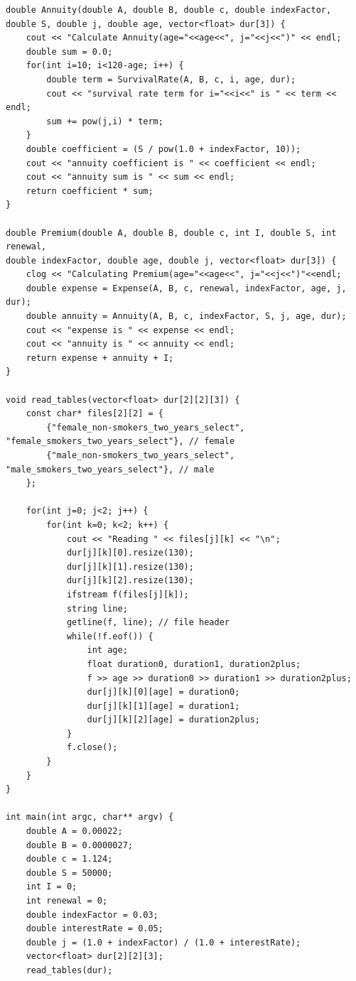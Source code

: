 \documentclass{report}
\begin{document}
\begin{verbatim}
double Annuity(double A, double B, double c, double indexFactor, 
double S, double j, double age, vector<float> dur[3]) {
    cout << "Calculate Annuity(age="<<age<<", j="<<j<<")" << endl;
    double sum = 0.0;
    for(int i=10; i<120-age; i++) {
        double term = SurvivalRate(A, B, c, i, age, dur);
        cout << "survival rate term for i="<<i<<" is " << term << endl;
        sum += pow(j,i) * term;
    }
    double coefficient = (S / pow(1.0 + indexFactor, 10));
    cout << "annuity coefficient is " << coefficient << endl;
    cout << "annuity sum is " << sum << endl;
    return coefficient * sum;
}

double Premium(double A, double B, double c, int I, double S, int renewal, 
double indexFactor, double age, double j, vector<float> dur[3]) {
    clog << "Calculating Premium(age="<<age<<", j="<<j<<")"<<endl;
    double expense = Expense(A, B, c, renewal, indexFactor, age, j, dur);
    double annuity = Annuity(A, B, c, indexFactor, S, j, age, dur);
    cout << "expense is " << expense << endl;
    cout << "annuity is " << annuity << endl;
	return expense + annuity + I;
}

void read_tables(vector<float> dur[2][2][3]) {
    const char* files[2][2] = {
        {"female_non-smokers_two_years_select", "female_smokers_two_years_select"}, // female
        {"male_non-smokers_two_years_select", "male_smokers_two_years_select"}, // male
    };

    for(int j=0; j<2; j++) {
        for(int k=0; k<2; k++) {
            cout << "Reading " << files[j][k] << "\n";
            dur[j][k][0].resize(130);
            dur[j][k][1].resize(130);
            dur[j][k][2].resize(130);
            ifstream f(files[j][k]);
            string line;
            getline(f, line); // file header
            while(!f.eof()) {
                int age;
                float duration0, duration1, duration2plus;
                f >> age >> duration0 >> duration1 >> duration2plus;
                dur[j][k][0][age] = duration0;
                dur[j][k][1][age] = duration1;
                dur[j][k][2][age] = duration2plus;
            }
            f.close();
        }
    }
}

int main(int argc, char** argv) {
    double A = 0.00022;
    double B = 0.0000027;
    double c = 1.124;
    double S = 50000;
	int I = 0;
	int renewal = 0;
	double indexFactor = 0.03;
    double interestRate = 0.05;
	double j = (1.0 + indexFactor) / (1.0 + interestRate);
    vector<float> dur[2][2][3];
    read_tables(dur);


\end{verbatim}
\end{document}
